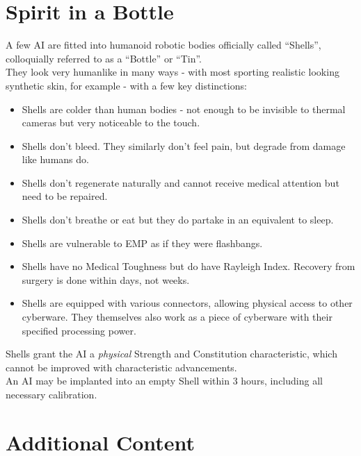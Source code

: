 \documentclass[12pt,a4paper,openany,usenames,dvipsnames]{book}
\begin{document}
	\chapter{Spirit in a Bottle}
	A few AI are fitted into humanoid robotic bodies officially called “Shells”, colloquially referred to as a “Bottle” or “Tin”.
	\\%
	They look very humanlike in many ways - with most sporting realistic looking synthetic skin, for example - with a few key distinctions:
	\vspace{-8mm}
	\begin{itemize}
		\setlength\itemsep{-8mm}
		\item Shells are colder than human bodies - not enough to be invisible to thermal cameras but very noticeable to the touch.
		\item Shells don’t bleed.
			They similarly don't feel pain,
				but degrade from damage like humans do.
		\item Shells don’t regenerate naturally and cannot receive medical attention but need to be repaired.
		\item Shells don’t breathe or eat but they do partake in an equivalent to sleep.
		\item Shells are vulnerable to EMP as if they were flashbangs.
		\item Shells have no Medical Toughness but do have Rayleigh Index. Recovery from surgery is done within days, not weeks.
		\item Shells are equipped with various connectors, allowing physical access to other cyberware. They themselves also work as a piece of cyberware with their specified processing power.
	\end{itemize}
	\par
	Shells grant the AI a \emph{physical} Strength and Constitution characteristic, which cannot be improved with characteristic advancements.
	\\%
	An AI may be implanted into an empty Shell within 3 hours, including all necessary calibration.

	\chapter{Additional Content}
	\vspace{-18mm}
\end{document}

